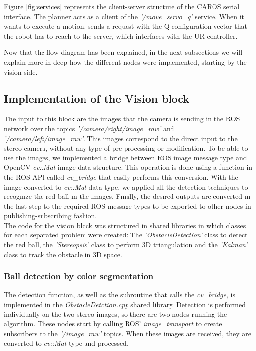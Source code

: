 Figure \ref{fig:services} represents the client-server structure of the CAROS serial interface. The planner acts as a client of the \textit{'/move\_servo\_q'} service. When it wants to execute a motion, sends a request with the Q configuration vector that the robot has to reach to the server, which interfaces with the UR controller. 

Now that the flow diagram has been explained, in the next subsections we will explain more in deep how the different nodes were implemented, starting by the vision side.

\subsection{Implementation of the Vision block}

The input to this block are the images that the camera is sending in the ROS network over the topics \textit{'/camera/right/image\_raw'} and \textit{'/camera/left/image\_raw'}. This images correspond to the direct input to the stereo camera, without any type of pre-processing or modification. To be able to use the images, we implemented a bridge between ROS image message type and OpenCV \textit{cv::Mat} image data structure. This operation is done using a function in the ROS API called \textit{cv\_bridge} that easily performs this conversion. With the image converted to \textit{cv::Mat} data type, we applied all the detection techniques to recognize the red ball in the images. Finally, the desired outputs are converted in the last step to the required ROS message types to be exported to other nodes in publishing-subscribing fashion.\\

The code for the vision block was structured in shared libraries in which classes for each separated problem were created: The \textit{'ObstacleDetection'} class to detect the red ball, the \textit{'Stereopsis'} class to perform 3D triangulation and the \textit{'Kalman'} class to track the obstacle in 3D space.

\subsubsection{Ball detection by color segmentation}

The detection function, as well as the subroutine that calls the \textit{cv\_bridge}, is implemented in the \textit{ObstacleDetction.cpp} shared library. Detection is performed individually on the two stereo images, so there are two nodes running the algorithm. These nodes start by calling ROS' \textit{image\_transport} to create subscribers to the \textit{'/image\_raw'} topics. When these images are received, they are converted to \textit{cv::Mat} type and processed. \\

